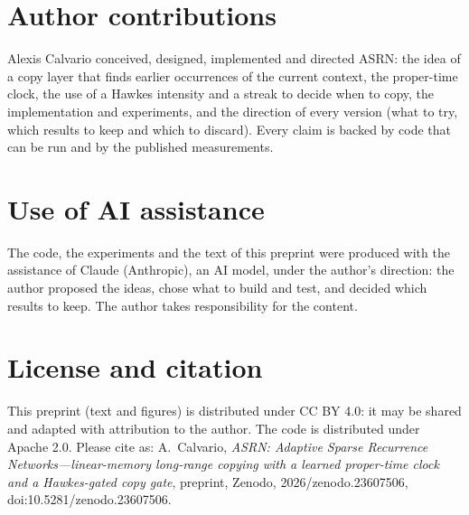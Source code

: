 \documentclass[11pt]{article}
\def\zenododoi{10.5281/zenodo.23607506}
\begin{document}
\section*{Author contributions}
Alexis Calvario conceived, designed, implemented and directed ASRN: the idea of a copy layer that finds earlier
occurrences of the current context, the proper-time clock, the use of a Hawkes intensity and a streak to decide when to
copy, the implementation and experiments, and the direction of every version (what to try, which results to keep and
which to discard). Every claim is backed by code that can be run and by the published measurements.

\section*{Use of AI assistance}
The code, the experiments and the text of this preprint were produced with the assistance of Claude (Anthropic), an
AI model, under the author's direction: the author proposed the ideas, chose what to build and test, and decided which
results to keep. The author takes responsibility for the content.

\section*{License and citation}
This preprint (text and figures) is distributed under CC BY 4.0: it may be shared and adapted with attribution to the
author. The code is distributed under Apache 2.0. Please cite as: A.~Calvario, \emph{ASRN: Adaptive Sparse Recurrence
Networks---linear-memory long-range copying with a learned proper-time clock and a Hawkes-gated copy gate}, preprint,
Zenodo, 2026\ifx\zenododoi\empty\else, doi:\zenododoi\fi.

{\footnotesize\setlength{\bibsep}{1pt plus 1pt}

}
\end{document}
